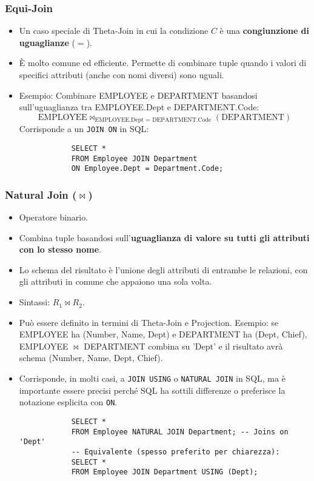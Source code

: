 \documentclass{article}
\newcommand{\naturaljoin}{\Join}
\newcommand{\thetajoin}[2]{\Join_{#1}(#2)}
\begin{document}
	\subsubsection{Equi-Join}
	\begin{itemize}
		\item Un caso speciale di Theta-Join in cui la condizione $C$ è una \textbf{congiunzione di uguaglianze} ($=$).
		\item È molto comune ed efficiente. Permette di combinare tuple quando i valori di specifici attributi (anche con nomi diversi) sono uguali.
		\item Esempio: Combinare EMPLOYEE e DEPARTMENT basandosi sull'uguaglianza tra EMPLOYEE.Dept e DEPARTMENT.Code:
		$$ \text{EMPLOYEE} \thetajoin{\text{EMPLOYEE.Dept = DEPARTMENT.Code}}{\text{DEPARTMENT}} $$
		Corrisponde a un \texttt{JOIN ON} in SQL:
		\begin{verbatim}
			SELECT *
			FROM Employee JOIN Department
			ON Employee.Dept = Department.Code;
		\end{verbatim}
	\end{itemize}
	
	\subsubsection{Natural Join ($\naturaljoin$)}
	\begin{itemize}
		\item Operatore binario.
		\item Combina tuple basandosi sull'\textbf{uguaglianza di valore su tutti gli attributi con lo stesso nome}.
		\item Lo schema del risultato è l'unione degli attributi di entrambe le relazioni, con gli attributi in comune che appaiono una sola volta.
		\item Sintassi: $R_1 \naturaljoin R_2$.
		\item Può essere definito in termini di Theta-Join e Projection. Esempio: se EMPLOYEE ha (Number, Name, Dept) e DEPARTMENT ha (Dept, Chief), EMPLOYEE $\naturaljoin$ DEPARTMENT combina su 'Dept' e il risultato avrà schema (Number, Name, Dept, Chief).
		\item Corrisponde, in molti casi, a \texttt{JOIN USING} o \texttt{NATURAL JOIN} in SQL, ma è importante essere precisi perché SQL ha sottili differenze o preferisce la notazione esplicita con \texttt{ON}.
		\begin{verbatim}
			SELECT *
			FROM Employee NATURAL JOIN Department; -- Joins on 'Dept'
			-- Equivalente (spesso preferito per chiarezza):
			SELECT *
			FROM Employee JOIN Department USING (Dept);
		\end{verbatim}
	\end{itemize}
	
\end{document}

